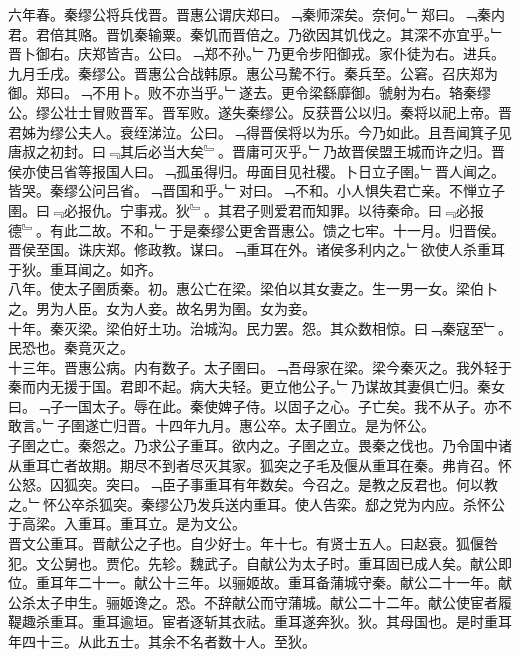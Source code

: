 \documentclass{zhvt-classic}
\begin{document}
\hspace*{2em}六年春。秦缪公将兵伐晋。晋惠公谓庆郑曰。﹁秦师深矣。奈何。﹂郑曰。﹁秦内君。君倍其赂。晋饥秦输粟。秦饥而晋倍之。乃欲因其饥伐之。其深不亦宜乎。﹂晋卜御右。庆郑皆吉。公曰。﹁郑不孙。﹂乃更令步阳御戎。家仆徒为右。进兵。九月壬戌。秦缪公。晋惠公合战韩原。惠公马騺不行。秦兵至。公窘。召庆郑为御。郑曰。﹁不用卜。败不亦当乎。﹂遂去。更令梁繇靡御。虢射为右。辂秦缪公。缪公壮士冒败晋军。晋军败。遂失秦缪公。反获晋公以归。秦将以祀上帝。晋君姊为缪公夫人。衰绖涕泣。公曰。﹁得晋侯将以为乐。今乃如此。且吾闻箕子见唐叔之初封。曰﹃其后必当大矣﹄。晋庸可灭乎。﹂乃故晋侯盟王城而许之归。晋侯亦使吕省等报国人曰。﹁孤虽得归。毋面目见社稷。卜日立子圉。﹂晋人闻之。皆哭。秦缪公问吕省。﹁晋国和乎。﹂对曰。﹁不和。小人惧失君亡亲。不惮立子圉。曰﹃必报仇。宁事戎。狄﹄。其君子则爱君而知罪。以待秦命。曰﹃必报德﹄。有此二故。不和。﹂于是秦缪公更舍晋惠公。馈之七牢。十一月。归晋侯。晋侯至国。诛庆郑。修政教。谋曰。﹁重耳在外。诸侯多利内之。﹂欲使人杀重耳于狄。重耳闻之。如齐。\\
\hspace*{2em}八年。使太子圉质秦。初。惠公亡在梁。梁伯以其女妻之。生一男一女。梁伯卜之。男为人臣。女为人妾。故名男为圉。女为妾。\\
\hspace*{2em}十年。秦灭梁。梁伯好土功。治城沟。民力罢。怨。其众数相惊。曰﹁秦寇至﹂。民恐也。秦竟灭之。\\
\hspace*{2em}十三年。晋惠公病。内有数子。太子圉曰。﹁吾母家在梁。梁今秦灭之。我外轻于秦而内无援于国。君即不起。病大夫轻。更立他公子。﹂乃谋故其妻俱亡归。秦女曰。﹁子一国太子。辱在此。秦使婢子侍。以固子之心。子亡矣。我不从子。亦不敢言。﹂子圉遂亡归晋。十四年九月。惠公卒。太子圉立。是为怀公。\\
\hspace*{2em}子圉之亡。秦怨之。乃求公子重耳。欲内之。子圉之立。畏秦之伐也。乃令国中诸从重耳亡者故期。期尽不到者尽灭其家。狐突之子毛及偃从重耳在秦。弗肯召。怀公怒。囚狐突。突曰。﹁臣子事重耳有年数矣。今召之。是教之反君也。何以教之。﹂怀公卒杀狐突。秦缪公乃发兵送内重耳。使人告栾。郄之党为内应。杀怀公于高梁。入重耳。重耳立。是为文公。\\
\hspace*{2em}晋文公重耳。晋献公之子也。自少好士。年十七。有贤士五人。曰赵衰。狐偃咎犯。文公舅也。贾佗。先轸。魏武子。自献公为太子时。重耳固已成人矣。献公即位。重耳年二十一。献公十三年。以骊姬故。重耳备蒲城守秦。献公二十一年。献公杀太子申生。骊姬谗之。恐。不辞献公而守蒲城。献公二十二年。献公使宦者履鞮趣杀重耳。重耳逾垣。宦者逐斩其衣祛。重耳遂奔狄。狄。其母国也。是时重耳年四十三。从此五士。其余不名者数十人。至狄。\\
\end{document}

